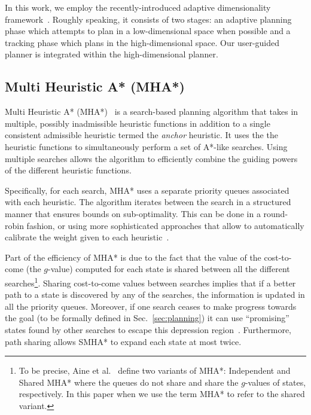 \documentclass[conference]{IEEEtran}
\begin{document}
In this work, we employ the recently-introduced adaptive dimensionality framework~\cite{GCBSL11, GSL12, GSL13}.
Roughly speaking,  it consists of two stages: an adaptive planning phase which attempts to plan in a low-dimensional space when possible and a tracking phase which plans in the high-dimensional space.
Our user-guided planner is integrated within the high-dimensional planner.

\subsection{Multi Heuristic A* (MHA*)}
\label{sec:mha}
Multi Heuristic A* (MHA*)~\cite{ASNHL16, NAL15} is a search-based planning algorithm that takes in multiple, possibly inadmissible heuristic functions in addition to a single consistent admissible heuristic termed the \emph{anchor} heuristic.
It uses the the heuristic functions to simultaneously perform a set of A*-like searches.
Using multiple searches allows the algorithm to efficiently combine the guiding powers of the different heuristic functions. 

Specifically, for each search, MHA* uses a separate priority queues associated with each heuristic. 
The algorithm iterates between the search in a structured manner that ensures bounds on sub-optimality. 
This can be done in a round-robin fashion, or using more 
sophisticated approaches that allow to automatically calibrate the weight given to each heuristic~\cite{PNAL15}.

Part of the efficiency of MHA* is due to the fact that the value of the cost-to-come (the $g$-value) computed for each state is shared between all the different searches\footnote{To be precise, Aine et al.~\cite{ASNHL16} define two variants of MHA*: Independent and Shared MHA* where the queues do not share and share the $g$-values of states, respectively. In this paper when we use the term MHA* to refer to the shared variant.}.
Sharing cost-to-come values between searches implies that if a better path to a state is discovered by any of the searches, the information is updated in all the
priority queues. 
Moreover, if one search ceases to make progress towards the goal (to be formally defined in Sec.~\ref{sec:planning}) it can use ``promising'' states found by other searches to escape this depression region~\cite{HB12, I92}.
Furthermore, path sharing allows SMHA* to expand each state at most twice.
\end{document}
